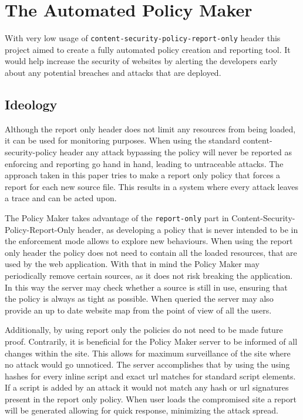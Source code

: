\chapter{The Automated Policy Maker}

With very low usage of \texttt{content-security-policy-report-only} header this project aimed to create a fully automated policy creation and reporting tool.
It would help increase the security of websites by alerting the developers early about any potential breaches and attacks that are deployed.

\section{Ideology}

Although the report only header does not limit any resources from being loaded, it can be used for monitoring purposes.
When using the standard content-security-policy header any attack bypassing the policy will never be reported as enforcing and reporting go hand in hand, leading to untraceable attacks.
The approach taken in this paper tries to make a report only policy that forces a report for each new source file.
This results in a system where every attack leaves a trace and can be acted upon.

The Policy Maker takes advantage of the \texttt{report-only} part in Content-Security-Policy-Report-Only header, as developing a policy that is never intended to be in the enforcement mode allows to explore new behaviours.
When using the report only header the policy does not need to contain all the loaded resources, that are used by the web application.
With that in mind the Policy Maker may periodically remove certain sources, as it does not risk breaking the application.
In this way the server may check whether a source is still in use, ensuring that the policy is always as tight as possible. 
When queried the server may also provide an up to date website map from the point of view of all the users.

Additionally, by using report only the policies do not need to be made future proof. 
Contrarily, it is beneficial for the Policy Maker server to be informed of all changes within the site.
This allows for maximum surveillance of the site where no attack would go unnoticed.
The server accomplishes that by using the using hashes for every inline script and exact url matches for standard script elements.
If a script is added by an attack it would not match any hash or url signatures present in the report only policy.
When user loads the compromised site a report will be generated allowing for quick response, minimizing the attack spread.


